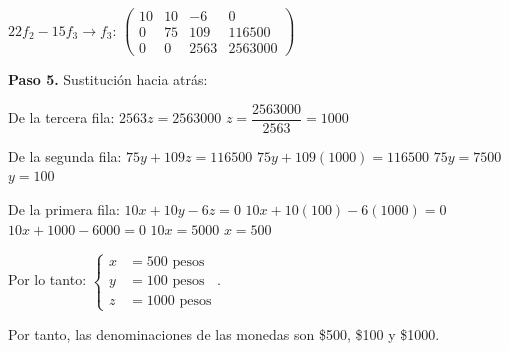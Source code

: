 \begin{prob}
\begin{myproof}
$22f_2 - 15f_3 \to f_3$: $\left(\begin{array}{ccc|c}
10 & 10 & -6 & 0 \\
0 & 75 & 109 & 116500 \\
0 & 0 & 2563 & 2563000
\end{array}\right)$

\textbf{Paso 5.} Sustitución hacia atrás:

De la tercera fila: $2563z = 2563000$
$z = \dfrac{2563000}{2563} = 1000$

De la segunda fila: $75y + 109z = 116500$
$75y + 109(1000) = 116500$
$75y = 7500$
$y = 100$

De la primera fila: $10x + 10y - 6z = 0$
$10x + 10(100) - 6(1000) = 0$
$10x + 1000 - 6000 = 0$
$10x = 5000$
$x = 500$

Por lo tanto: $\begin{cases}
x &= 500 \text{ pesos}\\
y &= 100 \text{ pesos}\\
z &= 1000 \text{ pesos}
\end{cases}.$

Por tanto, las denominaciones de las monedas son \$500, \$100 y \$1000.
\end{myproof}
\end{prob}


